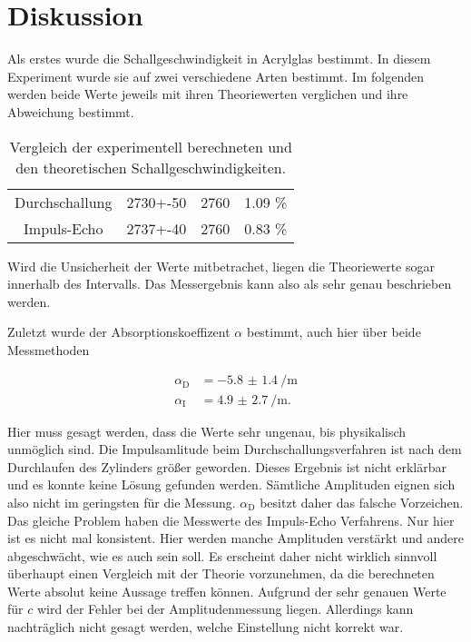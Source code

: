 \section{Diskussion}
\label{sec:Diskussion}


Als erstes wurde die Schallgeschwindigkeit in Acrylglas bestimmt.
In diesem Experiment wurde sie auf zwei verschiedene Arten bestimmt.
Im folgenden werden beide Werte jeweils mit ihren Theoriewerten verglichen und ihre Abweichung bestimmt.

\begin{table}
  \centering
  \caption{Vergleich der experimentell berechneten und den theoretischen Schallgeschwindigkeiten.\cite{schallgeschw}}
  \label{tab:e_lit}
  \begin{tabular}{c S[table-format=4.0,table-figures-uncertainty = 1] S[table-format=4.0] S[table-format=1.2]}
    \toprule 
    &  &  &  \\ 
    \midrule 
    Durchschallung & 2730+-50 & 2760 & 1.09 \% \\
    Impuls-Echo & 2737+-40 & 2760 & 0.83 \% \\
    \bottomrule
  \end{tabular}
\end{table}

Wird die Unsicherheit der Werte mitbetrachet, liegen die Theoriewerte sogar innerhalb des Intervalls.
Das Messergebnis kann also als sehr genau beschrieben werden.

Zuletzt wurde der Absorptionskoeffizent $\alpha$ bestimmt, auch hier über beide Messmethoden

\begin{align}
    \alpha _\text{D} &= \SI{-5.8(14)}{\per\meter}\\
    \alpha _\text{I} &= \SI{4.9(27)}{\per\meter}.
\end{align}

Hier muss gesagt werden, dass die Werte sehr ungenau, bis physikalisch unmöglich sind.
Die Impulsamlitude beim Durchschallungsverfahren ist nach dem Durchlaufen des Zylinders größer geworden.
Dieses Ergebnis ist nicht erklärbar und es konnte keine Lösung gefunden werden.
Sämtliche Amplituden eignen sich also nicht im geringsten für die Messung.
$\alpha _\text{D}$ besitzt daher das falsche Vorzeichen.
Das gleiche Problem haben die Messwerte des Impuls-Echo Verfahrens.
Nur hier ist es nicht mal konsistent. Hier werden manche Amplituden verstärkt und andere abgeschwächt, wie es auch sein soll. 
Es erscheint daher nicht wirklich sinnvoll überhaupt einen Vergleich mit der Theorie vorzunehmen, da die berechneten Werte absolut keine Aussage treffen können.
Aufgrund der sehr genauen Werte für $c$ wird der Fehler bei der Amplitudenmessung liegen.
Allerdings kann nachträglich nicht gesagt werden, welche Einstellung nicht korrekt war.
